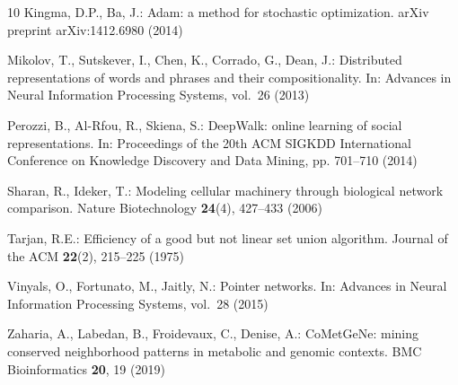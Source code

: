 \documentclass{llncs}
\begin{document}
\begin{thebibliography}{10}
Kingma, D.P., Ba, J.: Adam: a method for stochastic optimization. arXiv preprint arXiv:1412.6980 (2014)

Mikolov, T., Sutskever, I., Chen, K., Corrado, G., Dean, J.: Distributed representations of words and phrases and their compositionality. In: Advances in Neural Information Processing Systems, vol.~26 (2013)

Perozzi, B., Al-Rfou, R., Skiena, S.: DeepWalk: online learning of social representations. In: Proceedings of the 20th ACM SIGKDD International Conference on Knowledge Discovery and Data Mining, pp. 701--710 (2014)

Sharan, R., Ideker, T.: Modeling cellular machinery through biological network comparison. Nature Biotechnology \textbf{24}(4), 427--433 (2006)

Tarjan, R.E.: Efficiency of a good but not linear set union algorithm. Journal of the ACM \textbf{22}(2), 215--225 (1975)

Vinyals, O., Fortunato, M., Jaitly, N.: Pointer networks. In: Advances in Neural Information Processing Systems, vol.~28 (2015)

Zaharia, A., Labedan, B., Froidevaux, C., Denise, A.: CoMetGeNe: mining conserved neighborhood patterns in metabolic and genomic contexts. BMC Bioinformatics \textbf{20}, 19 (2019)

\end{thebibliography}
\end{document}

